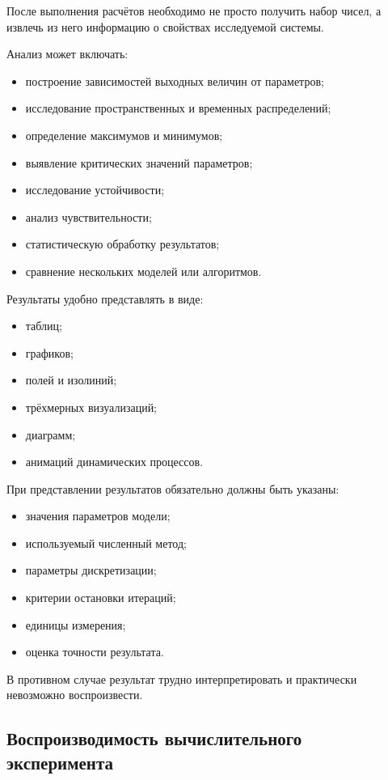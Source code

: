 После выполнения расчётов необходимо не просто получить набор чисел, а извлечь из него информацию о свойствах исследуемой системы.

Анализ может включать:
\begin{itemize}
	\item построение зависимостей выходных величин от параметров;
	\item исследование пространственных и временных распределений;
	\item определение максимумов и минимумов;
	\item выявление критических значений параметров;
	\item исследование устойчивости;
	\item анализ чувствительности;
	\item статистическую обработку результатов;
	\item сравнение нескольких моделей или алгоритмов.
\end{itemize}

Результаты удобно представлять в виде:
\begin{itemize}
	\item таблиц;
	\item графиков;
	\item полей и изолиний;
	\item трёхмерных визуализаций;
	\item диаграмм;
	\item анимаций динамических процессов.
\end{itemize}

При представлении результатов обязательно должны быть указаны:
\begin{itemize}
	\item значения параметров модели;
	\item используемый численный метод;
	\item параметры дискретизации;
	\item критерии остановки итераций;
	\item единицы измерения;
	\item оценка точности результата.
\end{itemize}

В противном случае результат трудно интерпретировать и практически невозможно воспроизвести.


\subsection{Воспроизводимость вычислительного эксперимента}

